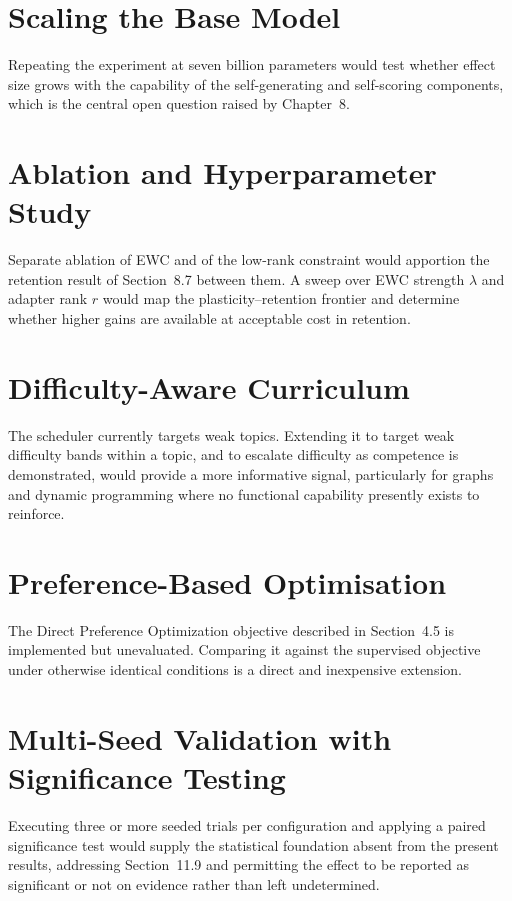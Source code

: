 \documentclass[12pt,a4paper]{report}
\begin{document}
\section{Scaling the Base Model}

Repeating the experiment at seven billion parameters would test whether effect size grows with the capability of the self-generating and self-scoring components, which is the central open question raised by Chapter~8.

\section{Ablation and Hyperparameter Study}

Separate ablation of EWC and of the low-rank constraint would apportion the retention result of Section~8.7 between them. A sweep over EWC strength $\lambda$ and adapter rank $r$ would map the plasticity--retention frontier and determine whether higher gains are available at acceptable cost in retention.

\section{Difficulty-Aware Curriculum}

The scheduler currently targets weak topics. Extending it to target weak difficulty bands within a topic, and to escalate difficulty as competence is demonstrated, would provide a more informative signal, particularly for graphs and dynamic programming where no functional capability presently exists to reinforce.

\section{Preference-Based Optimisation}

The Direct Preference Optimization objective described in Section~4.5 is implemented but unevaluated. Comparing it against the supervised objective under otherwise identical conditions is a direct and inexpensive extension.

\section{Multi-Seed Validation with Significance Testing}

Executing three or more seeded trials per configuration and applying a paired significance test would supply the statistical foundation absent from the present results, addressing Section~11.9 and permitting the effect to be reported as significant or not on evidence rather than left undetermined.
\end{document}
